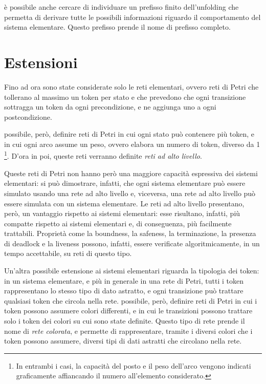 è possibile anche cercare di individuare un prefisso finito dell'unfolding
che permetta di derivare tutte le possibili informazioni riguardo il comportamento
del sistema elementare. Questo prefisso prende il nome di prefisso completo.


\section{Estensioni}
Fino ad ora sono state considerate solo le reti elementari, ovvero
reti di Petri che tollerano al massimo un token per stato e che
prevedono che ogni transizione sottragga un token da ogni precondizione, e
ne aggiunga uno a ogni postcondizione.

\upperAccE possibile, però, definire reti di Petri in cui ogni stato
può contenere più token, e in cui ogni arco assume un peso, ovvero elabora
un numero di token, diverso da 1 \footnote{In entrambi i casi,
la capacità del posto e il peso dell'arco vengono indicati graficamente
affiancando il numero all'elemento considerato.}. D'ora in poi, queste
reti verranno definite \textit{reti ad alto livello}.

Queste reti di Petri non hanno però una maggiore capacità espressiva
dei sistemi elementari: si può dimostrare, infatti, che
ogni sistema elementare può essere simulato usando una rete ad alto livello
e, viceversa, una rete ad alto livello può essere simulata con
un sistema elementare.
Le reti ad alto livello presentano, però, un vantaggio rispetto ai sistemi
elementari: esse risultano, infatti, più compatte rispetto ai sistemi
elementari e, di conseguenza, più facilmente trattabili.
Proprietà come la boundness, la safeness, la terminazione,
la presenza di deadlock e la liveness possono, infatti, essere verificate
algoritmicamente, in un tempo accettabile, su reti di questo tipo.

Un'altra possibile estensione ai sistemi elementari riguarda la tipologia
dei token: in un sistema elementare, e più in generale in una rete di
Petri, tutti i token rappresentano lo stesso tipo di dato astratto, e
ogni transizione può trattare qualsiasi token che circola nella rete.
\upperAccE possibile, però, definire reti di Petri in cui i token
possono assumere colori differenti, e in cui le transizioni possono
trattare solo i token dei colori su cui sono state definite.
Questo tipo di rete prende il nome di \textit{rete colorata}, e permette
di rappresentare, tramite i diversi colori che i token possono assumere,
diversi tipi di dati astratti che circolano nella rete.

